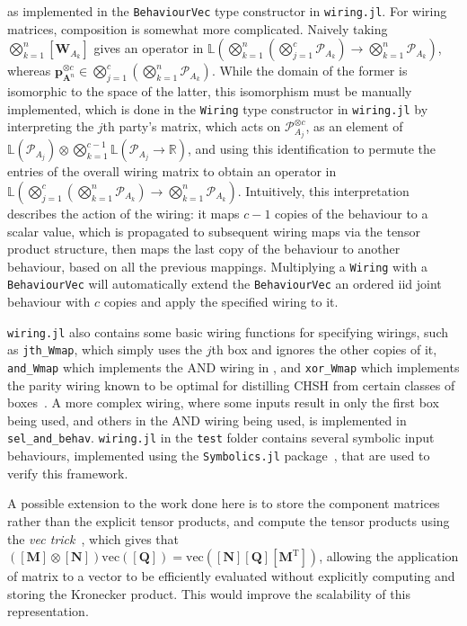 \documentclass[10pt, a4paper]{article}
\numberwithin{equation}{section} %
\theoremstyle{definition}
\theoremstyle{plain}
\newcommand{\?}{\mathrel{?}} %
\newcommand{\R}{\mathbb{R}} %
\newcommand{\Lin}[1]{\mathbb{L}\left(#1\right)}
\newcommand{\tpose}{\mathrm{T}}
\newcommand{\cvec}[1]{\boldsymbol{\mathbf{#1}}}    %
\newcommand{\matr}[2][]{\left[\mathbf{#2}#1\right]} %
\newcommand{\sP}{\mathcal{P}}
\begin{document}
                  as implemented in the \verb`BehaviourVec` type constructor in \verb`wiring.jl`. For wiring matrices, composition is somewhat more complicated. Naively taking \(\bigotimes_{k=1}^n \matr[_{A_k}]{W}\) gives an operator in \(\Lin{\bigotimes_{k=1}^n \left(\bigotimes_{j=1}^c \sP_{A_k}\right) \to \bigotimes_{k=1}^n \sP_{A_k}}\), whereas  \(\cvec{p}_{\cvec{A}^n}^{\otimes{c}} \in \bigotimes_{j=1}^c \left(\bigotimes_{k=1}^n \sP_{A_k}\right)\). While the domain of the former is isomorphic to the space of the latter, this isomorphism must be manually implemented, which is done in the \verb`Wiring` type constructor in \verb`wiring.jl` by interpreting the \(j\)th party's matrix, which acts on \(\sP_{A_j}^{\otimes c}\), as an element of \(\Lin{\sP_{A_j}} \otimes \bigotimes_{k=1}^{c-1} \Lin{\sP_{A_j} \to \R}\), and using this identification to permute the entries of the overall wiring matrix to obtain an operator in \(\Lin{\bigotimes_{j=1}^c \left(\bigotimes_{k=1}^n \sP_{A_k}\right) \to \bigotimes_{k=1}^n \sP_{A_k}}\). Intuitively, this interpretation describes the action of the wiring: it maps \(c-1\) copies of the behaviour to a scalar value, which is propagated to subsequent wiring maps via the tensor product structure, then maps the last copy of the behaviour to another behaviour, based on all the previous mappings. Multiplying a \verb`Wiring` with a \verb`BehaviourVec` will automatically extend the \verb`BehaviourVec` an ordered iid joint behaviour with \(c\) copies and apply the specified wiring to it.

                  \verb`wiring.jl` also contains some basic wiring functions for specifying wirings, such as \verb`jth_Wmap`, which simply uses the \(j\)th box and ignores the other copies of it, \verb`and_Wmap` which implements the AND wiring in , and \verb`xor_Wmap` which implements the parity wiring known to be optimal for distilling CHSH from certain classes of boxes~\cite{OptimalNLDistillation}. A more complex wiring, where some inputs result in only the first box being used, and others in the AND wiring being used, is implemented in \verb`sel_and_behav`. \verb`wiring.jl` in the \verb`test` folder contains several symbolic input behaviours, implemented using the \verb`Symbolics.jl` package~\cite{Symbolics}, that are used to verify this framework.

                  A possible extension to the work done here is to store the component matrices rather than the explicit tensor products, and compute the tensor products using the \emph{vec trick}~\cite{VecTrick}, which gives that \((\matr{M}\otimes\matr{N})\mathrm{vec}(\matr{Q}) = \mathrm{vec}(\matr{N}\matr{Q}\matr[^\tpose]{M})\), allowing the application of matrix to a vector to be efficiently evaluated without explicitly computing and storing the Kronecker product. This would improve the scalability of this representation.
\end{document}
